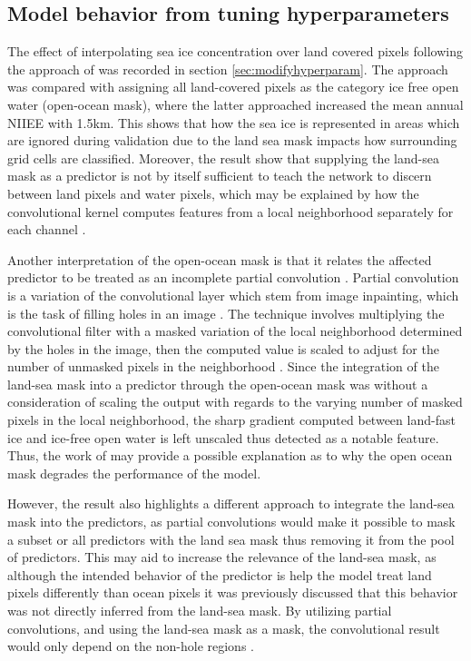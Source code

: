 \documentclass[../main/thesis]{subfiles}
\begin{document}
\subsection{Model behavior from tuning hyperparameters}
\label{sec:tuning_model}
The effect of interpolating sea ice concentration over land covered pixels following the approach of \citet{Wang2017} was recorded in section \ref{sec:modifyhyperparam}. The approach was compared with assigning all land-covered pixels as the category ice free open water (open-ocean mask), where the latter approached increased the mean annual NIIEE with 1.5km. This shows that how the sea ice is represented in areas which are ignored during validation due to the land sea mask impacts how surrounding grid cells are classified. Moreover, the result show that supplying the land-sea mask as a predictor is not by itself sufficient to teach the network to discern between land pixels and water pixels, which may be explained by how the convolutional kernel computes features from a local neighborhood separately for each channel \citep{Fukushima1980}.

Another interpretation of the open-ocean mask is that it relates the affected predictor to be treated as an incomplete partial convolution \citep{Liu2018}. Partial convolution is a variation of the convolutional layer which stem from image inpainting, which is the task of filling holes in an image \citep{Liu2018}. The technique involves multiplying the convolutional filter with a masked variation of the local neighborhood determined by the holes in the image, then the computed value is scaled to adjust for the number of unmasked pixels in the neighborhood \citep{Liu2018}. Since the integration of the land-sea mask into a predictor through the open-ocean mask was without a consideration of scaling the output with regards to the varying number of masked pixels in the local neighborhood, the sharp gradient computed between land-fast ice and ice-free open water is left unscaled thus detected as a notable feature. Thus, the work of \citet{Liu2018} may provide a possible explanation as to why the open ocean mask degrades the performance of the model. 

However, the result also highlights a different approach to integrate the land-sea mask into the predictors, as partial convolutions would make it possible to mask a subset or all predictors with the land sea mask thus removing it from the pool of predictors. This may aid to increase the relevance of the land-sea mask, as although the intended behavior of the predictor is help the model treat land pixels differently than ocean pixels it was previously discussed that this behavior was not directly inferred from the land-sea mask. By utilizing partial convolutions, and using the land-sea mask as a mask, the convolutional result would only depend on the non-hole regions \citep{Liu2018}.
\end{document}
